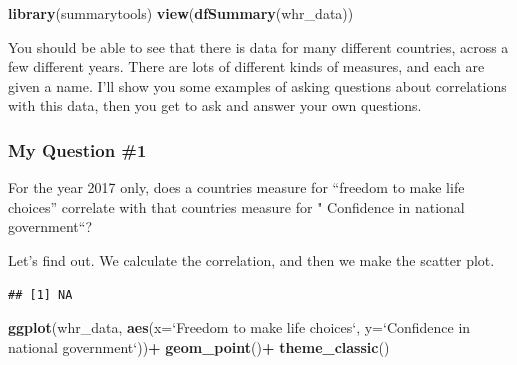 \documentclass[]{book}
\newenvironment{Shaded}{\begin{snugshade}}{\end{snugshade}}
\newcommand{\KeywordTok}[1]{\textcolor[rgb]{0.13,0.29,0.53}{\textbf{#1}}}
\newcommand{\DataTypeTok}[1]{\textcolor[rgb]{0.13,0.29,0.53}{#1}}
\newcommand{\StringTok}[1]{\textcolor[rgb]{0.31,0.60,0.02}{#1}}
\newcommand{\OperatorTok}[1]{\textcolor[rgb]{0.81,0.36,0.00}{\textbf{#1}}}
\newcommand{\NormalTok}[1]{#1}
\begin{document}
\begin{Shaded}
\begin{Highlighting}[]
\KeywordTok{library}\NormalTok{(summarytools)}
\KeywordTok{view}\NormalTok{(}\KeywordTok{dfSummary}\NormalTok{(whr_data))}
\end{Highlighting}
\end{Shaded}

You should be able to see that there is data for many different
countries, across a few different years. There are lots of different
kinds of measures, and each are given a name. I'll show you some
examples of asking questions about correlations with this data, then you
get to ask and answer your own questions.

\subsubsection{My Question \#1}\label{my-question-1}

For the year 2017 only, does a countries measure for ``freedom to make
life choices'' correlate with that countries measure for " Confidence in
national government``?

Let's find out. We calculate the correlation, and then we make the
scatter plot.

\begin{Shaded}
\end{Shaded}

\begin{verbatim}
## [1] NA
\end{verbatim}

\begin{Shaded}
\begin{Highlighting}[]
\KeywordTok{ggplot}\NormalTok{(whr_data, }\KeywordTok{aes}\NormalTok{(}\DataTypeTok{x=}\StringTok{`}\DataTypeTok{Freedom to make life choices}\StringTok{`}\NormalTok{,}
                     \DataTypeTok{y=}\StringTok{`}\DataTypeTok{Confidence in national government}\StringTok{`}\NormalTok{))}\OperatorTok{+}
\StringTok{  }\KeywordTok{geom_point}\NormalTok{()}\OperatorTok{+}
\StringTok{  }\KeywordTok{theme_classic}\NormalTok{()}
\end{Highlighting}
\end{Shaded}
\end{document}
